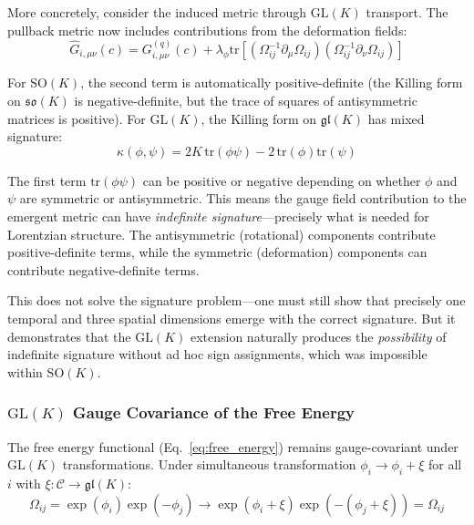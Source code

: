 \documentclass[11pt]{article}
\begin{document}
More concretely, consider the induced metric through $\mathrm{GL}(K)$ transport. The pullback metric now includes contributions from the deformation fields:
\begin{equation}
\hat{G}_{i,\mu\nu}(c) = G^{(q)}_{i,\mu\nu}(c) + \lambda_\phi \mathrm{tr}[(\Omega_{ij}^{-1}\partial_\mu\Omega_{ij})(\Omega_{ij}^{-1}\partial_\nu\Omega_{ij})]
\end{equation}

For $\mathrm{SO}(K)$, the second term is automatically positive-definite (the Killing form on $\mathfrak{so}(K)$ is negative-definite, but the trace of squares of antisymmetric matrices is positive). For $\mathrm{GL}(K)$, the Killing form on $\mathfrak{gl}(K)$ has mixed signature:
\begin{equation}
\kappa(\phi, \psi) = 2K\,\mathrm{tr}(\phi\psi) - 2\,\mathrm{tr}(\phi)\mathrm{tr}(\psi)
\end{equation}

The first term $\mathrm{tr}(\phi\psi)$ can be positive or negative depending on whether $\phi$ and $\psi$ are symmetric or antisymmetric. This means the gauge field contribution to the emergent metric can have \emph{indefinite signature}---precisely what is needed for Lorentzian structure. The antisymmetric (rotational) components contribute positive-definite terms, while the symmetric (deformation) components can contribute negative-definite terms.

This does not solve the signature problem---one must still show that precisely one temporal and three spatial dimensions emerge with the correct signature. But it demonstrates that the $\mathrm{GL}(K)$ extension naturally produces the \emph{possibility} of indefinite signature without ad hoc sign assignments, which was impossible within $\mathrm{SO}(K)$.

\subsubsection{$\mathrm{GL}(K)$ Gauge Covariance of the Free Energy}

The free energy functional (Eq.~\ref{eq:free_energy}) remains gauge-covariant under $\mathrm{GL}(K)$ transformations. Under simultaneous transformation $\phi_i \to \phi_i + \xi$ for all $i$ with $\xi: \mathcal{C} \to \mathfrak{gl}(K)$:
\begin{equation}
\Omega_{ij} = \exp(\phi_i)\exp(-\phi_j) \to \exp(\phi_i + \xi)\exp(-(\phi_j + \xi)) = \Omega_{ij}
\end{equation}
\end{document}

